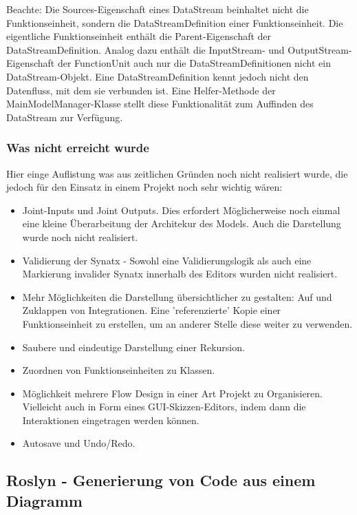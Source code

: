 \begin{enumerate}
	Beachte: Die Sources-Eigenschaft eines DataStream beinhaltet nicht die Funktionseinheit,
	sondern die DataStreamDefinition einer Funktionseinheit. Die eigentliche
	Funktionseinheit enthält die Parent-Eigenschaft der DataStreamDefinition.
	Analog dazu enthält die InputStream- und OutputStream-Eigenschaft der
	FunctionUnit auch nur die DataStreamDefinitionen nicht ein DataStream-Objekt.
	Eine DataStreamDefinition kennt jedoch nicht den Datenfluss, mit dem sie
	verbunden ist. Eine Helfer-Methode der MainModelManager-Klasse stellt
	diese Funktionalität zum Auffinden des DataStream zur Verfügung.
\end{enumerate}

\subsubsection{Was nicht erreicht wurde}
\label{sec:orgheadline32}
Hier einge Auflistung was aus zeitlichen Gründen noch nicht realisiert
wurde, die jedoch für den Einsatz in einem Projekt noch sehr wichtig wären:
\begin{itemize}
	\item Joint-Inputs und Joint Outputs. Dies erfordert Möglicherweise noch einmal
	eine kleine Überarbeitung der Architekur des Models. Auch die Darstellung
	wurde noch nicht realisiert.
	\item Validierung der Synatx - Sowohl eine Validierungslogik als auch eine
	Markierung invalider Synatx innerhalb des Editors wurden nicht realisiert.
	\item Mehr Möglichkeiten die Darstellung übersichtlicher zu gestalten: Auf und
	Zuklappen von Integrationen. Eine 'referenzierte' Kopie einer
	Funktionseinheit zu erstellen, um an anderer Stelle diese weiter zu
	verwenden.
	\item Saubere und eindeutige Darstellung einer Rekursion.
	\item Zuordnen von Funktionseinheiten zu Klassen.
	\item Möglichkeit mehrere Flow Design in einer Art Projekt zu Organisieren.
	Vielleicht auch in Form eines GUI-Skizzen-Editors, indem dann die
	Interaktionen eingetragen werden können.
	\item Autosave und Undo/Redo.
\end{itemize}



\subsection{Roslyn - Generierung von Code aus einem Diagramm}
\label{sec:orgheadline52}

